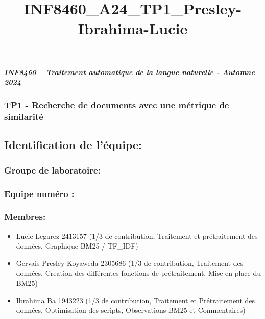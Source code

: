 \documentclass[11pt]{article}
\title{INF8460\_A24\_TP1\_Presley-Ibrahima-Lucie}
\providecommand{\tightlist}{%
      \setlength{\itemsep}{0pt}\setlength{\parskip}{0pt}}
\begin{document}
    
    \maketitle
    
    

    
    \subparagraph{INF8460 -- Traitement automatique de la langue naturelle -
Automne
2024}\label{inf8460-traitement-automatique-de-la-langue-naturelle---automne-2024}

\subsubsection{TP1 - Recherche de documents avec une métrique de
similarité}\label{tp1---recherche-de-documents-avec-une-muxe9trique-de-similarituxe9}

    \subsection{Identification de
l'équipe:}\label{identification-de-luxe9quipe}

\subsubsection{Groupe de laboratoire:}\label{groupe-de-laboratoire}

\subsubsection{Equipe numéro :}\label{equipe-numuxe9ro}

\subsubsection{Membres:}\label{membres}

\begin{itemize}
\tightlist
\item
  Lucie Legarez 2413157 (1/3 de contribution, Traitement et
  prétraitement des données, Graphique BM25 / TF\_IDF)
\item
  Gervais Presley Koyaweda 2305686 (1/3 de contribution, Traitement des
  données, Creation des différentes fonctions de prétraitement, Mise en
  place du BM25)
\item
  Ibrahima Ba 1943223 (1/3 de contribution, Traitement et Prétraitement
  des données, Optimisation des scripts, Observations BM25 et
  Commentaires)
\end{itemize}
\end{document}
